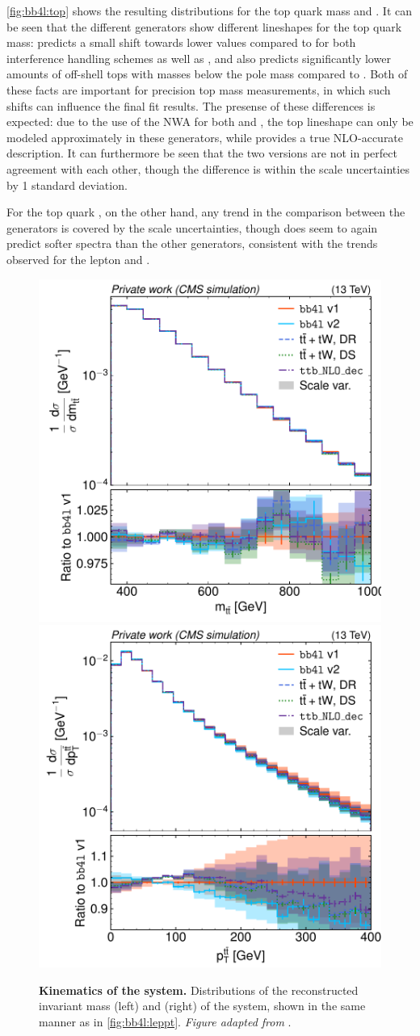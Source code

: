 \cref{fig:bb4l:top} shows the resulting distributions for the top quark mass and \pt. It can be seen that the different generators show different lineshapes for the top quark mass: \bbfourl predicts a small shift towards lower values compared to \tttWsum for both interference handling schemes as well as \ttb, and also predicts significantly lower amounts of off-shell tops with masses below the pole mass compared to \tttWsum. Both of these facts are important for precision top mass measurements, in which such shifts can influence the final fit results. The presense of these differences is expected: due to the use of the NWA for both \tttWsum and \ttb, the top lineshape can only be modeled approximately in these generators, while \bbfourl provides a true NLO-accurate description. It can furthermore be seen that the two \bbfourl versions are not in perfect agreement with each other, though the difference is within the scale uncertainties by 1 standard deviation.

For the top quark \pt, on the other hand, any trend in the comparison between the generators is covered by the scale uncertainties, though \bbfourl does seem to again predict softer \pt spectra than the other generators, consistent with the trends observed for the lepton \pt and \mll.

\begin{figure}[tp]
    \centering
    \includegraphics[width=0.49 \textwidth]{figures/bb4l/generators/MC_TTBAR_DILEP_SPINDENSITY_ttbar_mass.pdf}
    \hfill
    \includegraphics[width=0.49 \textwidth]{figures/bb4l/generators/MC_TTBAR_DILEP_SPINDENSITY_ttbar_pt.pdf}
    \caption{\textbf{Kinematics of the \ttbar system.} Distributions of the reconstructed invariant mass (left) and \pt (right) of the \ttbar system, shown in the same manner as in \cref{fig:bb4l:leppt}. \textit{Figure adapted from }.}
    \label{fig:bb4l:ttbar}
\end{figure}

